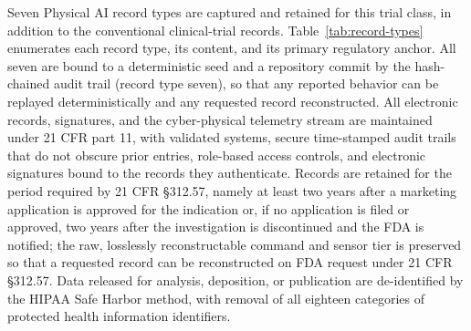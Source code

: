Seven Physical AI record types are captured and retained for this trial class, in
addition to the conventional clinical-trial records. Table~\ref{tab:record-types}
enumerates each record type, its content, and its primary regulatory anchor. All
seven are bound to a deterministic seed and a repository commit by the hash-chained
audit trail (record type seven), so that any reported behavior can be replayed
deterministically and any requested record reconstructed. All electronic records,
signatures, and the cyber-physical telemetry stream are maintained under 21 CFR part
11, with validated systems, secure time-stamped audit trails that do not obscure
prior entries, role-based access controls, and electronic signatures bound to the
records they authenticate. Records are retained for the period required by 21 CFR
\S 312.57, namely at least two years after a marketing application is approved for
the indication or, if no application is filed or approved, two years after the
investigation is discontinued and the FDA is notified; the raw, losslessly
reconstructable command and sensor tier is preserved so that a requested record can
be reconstructed on FDA request under 21 CFR \S 312.57. Data released for analysis,
deposition, or publication are de-identified by the HIPAA Safe Harbor method, with
removal of all eighteen categories of protected health information identifiers.


